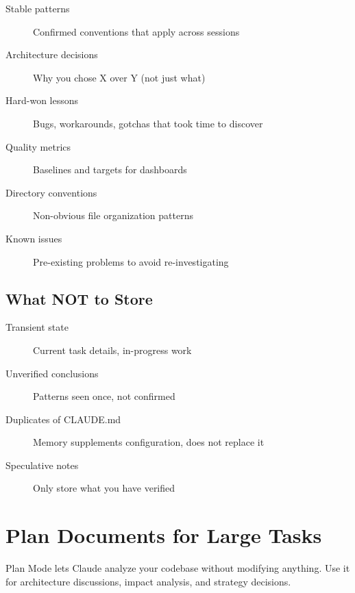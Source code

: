 \begin{description}
  \item[Stable patterns] Confirmed conventions that apply across sessions
  \item[Architecture decisions] Why you chose X over Y (not just what)
  \item[Hard-won lessons] Bugs, workarounds, gotchas that took time to discover
  \item[Quality metrics] Baselines and targets for dashboards
  \item[Directory conventions] Non-obvious file organization patterns
  \item[Known issues] Pre-existing problems to avoid re-investigating
\end{description}

\subsection{What NOT to Store}

\begin{description}
  \item[Transient state] Current task details, in-progress work
  \item[Unverified conclusions] Patterns seen once, not confirmed
  \item[Duplicates of CLAUDE.md] Memory supplements configuration, does not replace it
  \item[Speculative notes] Only store what you have verified
\end{description}


\section{Plan Documents for Large Tasks}
\label{sec:plans}



Plan Mode lets Claude analyze your codebase without modifying anything.
Use it for architecture discussions, impact analysis, and strategy decisions.

